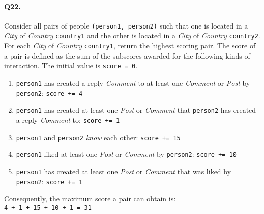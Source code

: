 \paragraph{Q22.}
Consider all pairs of people \texttt{(person1,\ person2)} such that one
is located in a \emph{City} of \emph{Country} \texttt{country1} and the
other is located in a \emph{City} of \emph{Country} \texttt{country2}.
For each \emph{City} of \emph{Country} \texttt{country1}, return the
highest scoring pair.
The score of a pair is defined as the sum of the subscores awarded for
the following kinds of interaction. The initial value is
\texttt{score\ =\ 0}.
\begin{enumerate}
\def\labelenumi{\arabic{enumi}.}
\tightlist
\item
  \texttt{person1} has created a reply \emph{Comment} to at least one
  \emph{Comment} or \emph{Post} by \texttt{person2}:
  \texttt{score\ +=\ 4}
\item
  \texttt{person1} has created at least one \emph{Post} or
  \emph{Comment} that \texttt{person2} has created a reply
  \emph{Comment} to: \texttt{score\ +=\ 1}
\item
  \texttt{person1} and \texttt{person2} \emph{know} each other:
  \texttt{score\ +=\ 15}
\item
  \texttt{person1} liked at least one \emph{Post} or \emph{Comment} by
  \texttt{person2}: \texttt{score\ +=\ 10}
\item
  \texttt{person1} has created at least one \emph{Post} or
  \emph{Comment} that was liked by \texttt{person2}:
  \texttt{score\ +=\ 1}
\end{enumerate}
Consequently, the maximum score a pair can obtain is:
\texttt{4\ +\ 1\ +\ 15\ +\ 10\ +\ 1\ =\ 31}

